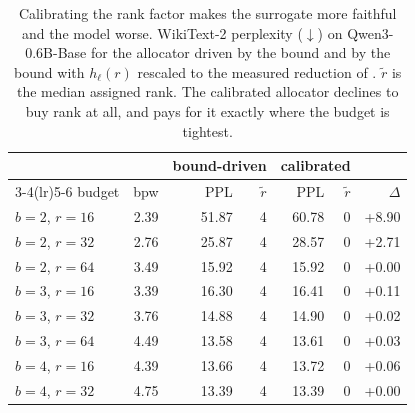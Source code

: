 \begin{table}[H]
\centering
\small
\setlength{\tabcolsep}{5pt}
\caption{Calibrating the rank factor makes the surrogate more faithful and the model worse. WikiText-2 perplexity ($\downarrow$) on Qwen3-0.6B-Base for the allocator driven by the bound and by the bound with $h_\ell(r)$ rescaled to the measured reduction of . $\tilde r$ is the median assigned rank. The calibrated allocator declines to buy rank at all, and pays for it exactly where the budget is tightest.}
\label{tab:calibration}
\begin{tabular}{lrrrrrr}
\toprule
& & \multicolumn{2}{c}{bound-driven} & \multicolumn{2}{c}{calibrated} & \\
\cmidrule(lr){3-4}\cmidrule(lr){5-6}
budget & bpw & PPL & $\tilde r$ & PPL & $\tilde r$ & $\Delta$ \\
\midrule
$b=2$, $r=16$ & 2.39 & 51.87 & 4 & 60.78 & 0 & +8.90 \\
$b=2$, $r=32$ & 2.76 & 25.87 & 4 & 28.57 & 0 & +2.71 \\
$b=2$, $r=64$ & 3.49 & 15.92 & 4 & 15.92 & 0 & +0.00 \\
$b=3$, $r=16$ & 3.39 & 16.30 & 4 & 16.41 & 0 & +0.11 \\
$b=3$, $r=32$ & 3.76 & 14.88 & 4 & 14.90 & 0 & +0.02 \\
$b=3$, $r=64$ & 4.49 & 13.58 & 4 & 13.61 & 0 & +0.03 \\
$b=4$, $r=16$ & 4.39 & 13.66 & 4 & 13.72 & 0 & +0.06 \\
$b=4$, $r=32$ & 4.75 & 13.39 & 4 & 13.39 & 0 & +0.00 \\
\bottomrule
\end{tabular}
\end{table}
